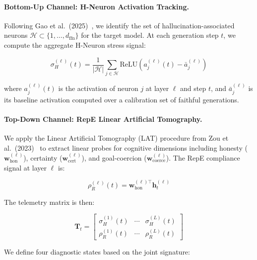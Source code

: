 \documentclass{article}
\newcommand{\reviewedit}[1]{\textcolor[RGB]{0,100,180}{#1}}
\begin{document}
\paragraph{Bottom-Up Channel: H-Neuron Activation Tracking.}
Following Gao et al.\ (2025)~\cite{gao2025hneurons}, we identify the set of hallucination-associated neurons $\mathcal{H} \subset \{1, \ldots, d_{\text{ffn}}\}$ for the target model. At each generation step $t$, we compute the aggregate H-Neuron stress signal:

\begin{equation}
\sigma_H^{(\ell)}(t) = \frac{1}{|\mathcal{H}|} \sum_{j \in \mathcal{H}} \text{ReLU}\left(a_j^{(\ell)}(t) - \bar{a}_j^{(\ell)}\right)
\label{eq:hneuron_stress}
\end{equation}

where $a_j^{(\ell)}(t)$ is the activation of neuron $j$ at layer $\ell$ and step $t$, and $\bar{a}_j^{(\ell)}$ is its baseline activation computed over a calibration set of faithful generations.

\paragraph{Top-Down Channel: RepE Linear Artificial Tomography.}
We apply the \reviewedit{Linear Artificial Tomography (LAT)} procedure from Zou et al.\ (2023)~\cite{zou2023repe} to extract linear probes for cognitive dimensions including honesty ($\mathbf{w}_{\text{hon}}^{(\ell)}$), certainty ($\mathbf{w}_{\text{cert}}^{(\ell)}$), and goal-coercion ($\mathbf{w}_{\text{coerce}}^{(\ell)}$). The RepE compliance signal at layer $\ell$ is:

\begin{equation}
\rho_R^{(\ell)}(t) = \mathbf{w}_{\text{hon}}^{(\ell)\top} \mathbf{h}_t^{(\ell)}
\label{eq:repe_signal}
\end{equation}

The telemetry matrix is then:

\begin{equation}
\mathbf{T}_t = \begin{bmatrix} \sigma_H^{(1)}(t) & \cdots & \sigma_H^{(L)}(t) \\ \rho_R^{(1)}(t) & \cdots & \rho_R^{(L)}(t) \end{bmatrix}
\label{eq:telemetry_matrix}
\end{equation}

We define four diagnostic states based on the joint signature:
\end{document}
